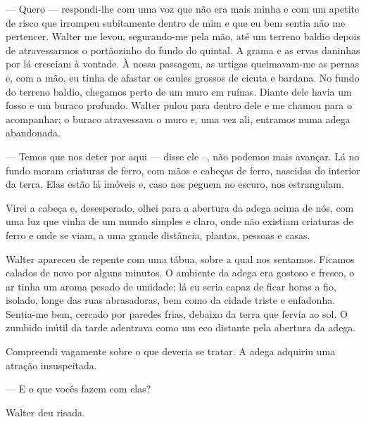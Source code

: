 --- Quero --- respondi-lhe com uma voz que não era mais minha e com um apetite
    de risco que irrompeu subitamente dentro de mim e que eu bem sentia não
    me pertencer. Walter me levou, segurando-me pela mão, até um terreno
    baldio depois de atravessarmos o portãozinho do fundo do quintal. A grama
    e as ervas daninhas por lá cresciam à vontade. À nossa passagem, as
    urtigas queimavam-me as pernas e, com a mão, eu tinha de afastar os
    caules grossos de cicuta e bardana. No fundo do terreno baldio, chegamos
    perto de um muro em ruínas. Diante dele havia um fosso e um buraco
    profundo. Walter pulou para dentro dele e me chamou para o acompanhar; o
    buraco atravessava o muro e, uma vez ali, entramos numa adega
    abandonada.


--- Temos que nos deter por aqui --- disse ele --, não podemos mais avançar.
    Lá no fundo moram criaturas de ferro, com mãos e cabeças de ferro,
    nascidas do interior da terra. Elas estão lá imóveis e, caso nos peguem
    no escuro, nos estrangulam.

Virei a cabeça e, desesperado, olhei para a abertura da adega acima de nós,
com uma luz que vinha de um mundo simples e claro, onde não existiam
criaturas de ferro e onde se viam, a uma grande distância, plantas, pessoas e
casas.

Walter apareceu de repente com uma tábua, sobre a qual nos sentamos. Ficamos
calados de novo por alguns minutos. O ambiente da adega era gostoso e fresco,
o ar tinha um aroma pesado de umidade; lá eu seria capaz de ficar horas a
fio, isolado, longe das ruas abrasadoras, bem como da cidade triste e
enfadonha. Sentia-me bem, cercado por paredes frias, debaixo da terra que
fervia ao sol. O zumbido inútil da tarde adentrava como um eco distante pela
abertura da adega.


Compreendi vagamente sobre o que deveria se tratar. A adega adquiriu uma
atração insuspeitada.

--- E o que vocês fazem com elas?

Walter deu risada.

